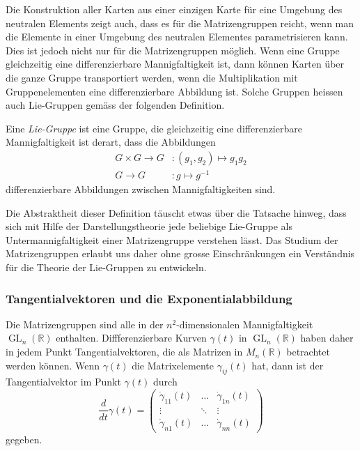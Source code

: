 Die Konstruktion aller Karten aus einer einzigen Karte für eine
Umgebung des neutralen Elements zeigt auch, dass es für die Matrizengruppen
reicht, wenn man die Elemente in einer Umgebung des neutralen
Elementes parametrisieren kann.
Dies ist jedoch nicht nur für die Matrizengruppen möglich.
Wenn eine Gruppe gleichzeitig eine differenzierbare Mannigfaltigkeit
ist, dann können Karten über die ganze Gruppe transportiert werden,
wenn die Multiplikation mit Gruppenelementen eine differenzierbare
Abbildung ist.
Solche Gruppen heissen auch Lie-Gruppen gemäss der folgenden Definition.

\begin{definition}
%
Eine {\em Lie-Gruppe} ist eine Gruppe, die gleichzeitig eine differenzierbare
Mannigfaltigkeit ist derart, dass die Abbildungen
\begin{align*}
G\times G \to G &: (g_1,g_2)\mapsto g_1g_2
\\
G\to G &: g \mapsto g^{-1}
\end{align*}
differenzierbare Abbildungen zwischen Mannigfaltigkeiten sind.
\end{definition}

Die Abstraktheit dieser Definition täuscht etwas über die 
Tatsache hinweg, dass sich mit Hilfe der Darstellungstheorie
jede beliebige Lie-Gruppe als Untermannigfaltigkeit einer 
Matrizengruppe verstehen lässt.
Das Studium der Matrizengruppen erlaubt uns daher ohne grosse
Einschränkungen ein Verständnis für die Theorie der Lie-Gruppen
zu entwickeln.

\subsubsection{Tangentialvektoren und die Exponentialabbildung}
Die Matrizengruppen sind alle in der
$n^2$-dimensionalen Mannigfaltigkeit $\operatorname{GL}_n(\mathbb{R})$
enthalten.
Diffferenzierbare Kurven $\gamma(t)$ in $\operatorname{GL}_n(\mathbb{R})$
haben daher in jedem Punkt Tangentialvektoren, die als Matrizen in
$M_n(\mathbb{R})$ betrachtet werden können.
Wenn $\gamma(t)$ die Matrixelemente $\gamma_{i\!j}(t)$ hat, dann ist der
Tangentialvektor im Punkt $\gamma(t)$ durch
\[
\frac{d}{dt}
\gamma(t)
=
\begin{pmatrix}
\dot{\gamma}_{11}(t)&\dots &\dot{\gamma}_{1n}(t)\\
\vdots              &\ddots&\vdots              \\
\dot{\gamma}_{n1}(t)&\dots &\dot{\gamma}_{nn}(t)
\end{pmatrix}
\]
gegeben.

